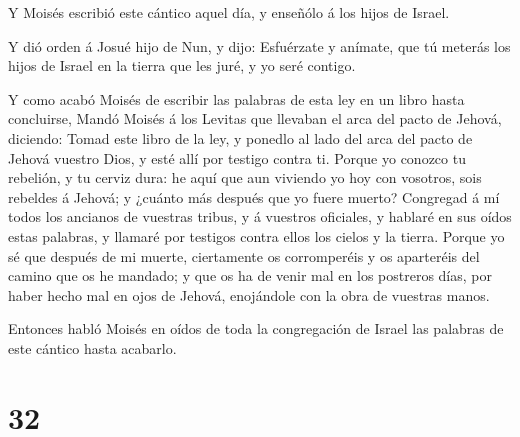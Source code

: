 Y Moisés escribió este cántico aquel día, y enseñólo á los
hijos de Israel.

 Y dió orden á Josué hijo de Nun, y dijo: Esfuérzate y
anímate, que tú meterás los hijos de Israel en la tierra que les juré, y
yo seré contigo.

 Y como acabó Moisés de escribir las palabras de esta ley
en un libro hasta concluirse,  Mandó Moisés á los Levitas
que llevaban el arca del pacto de Jehová, diciendo:  Tomad
este libro de la ley, y ponedlo al lado del arca del pacto de Jehová
vuestro Dios, y esté allí por testigo contra ti.  Porque yo
conozco tu rebelión, y tu cerviz dura: he aquí que aun viviendo yo hoy
con vosotros, sois rebeldes á Jehová; y ¿cuánto más después que yo fuere
muerto?  Congregad á mí todos los ancianos de vuestras
tribus, y á vuestros oficiales, y hablaré en sus oídos estas palabras, y
llamaré por testigos contra ellos los cielos y la tierra. 
Porque yo sé que después de mi muerte, ciertamente os corromperéis y os
aparteréis del camino que os he mandado; y que os ha de venir mal en los
postreros días, por haber hecho mal en ojos de Jehová, enojándole con la
obra de vuestras manos.

 Entonces habló Moisés en oídos de toda la congregación de
Israel las palabras de este cántico hasta acabarlo.

\hypertarget{section-31}{%
\section{32}\label{section-31}}

